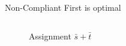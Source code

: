 \documentclass[xcolor=svgnames, english, smaller]{beamer}
\theoremstyle{plain}
\theoremstyle{definition}
\theoremstyle{plain}
\theoremstyle{plain}
\begin{document}
\begin{frame}{Non-Compliant First is optimal}
\begin{columns}[t]
\begin{figure}
\caption{Assignment $\bar{s}+\bar{t}$}
\end{figure}



\end{columns}
\end{frame}
\end{document}
